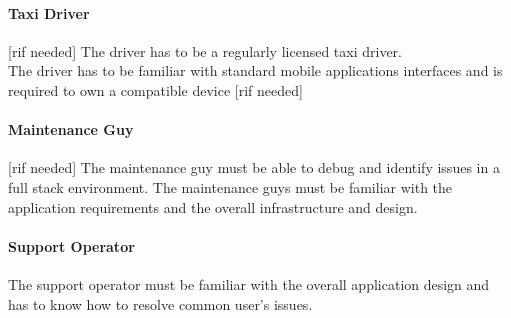 \documentclass[12pt, a4paper]{article}
\begin{document}
\paragraph{Taxi Driver}\label{par:taxy_driver} [rif needed] The driver has to be a regularly licensed taxi driver.\\ The driver has to be familiar with standard mobile applications interfaces and is required to own a compatible device [rif needed]
\paragraph{Maintenance Guy} \label{par:maintenance_guy}
[rif needed] The maintenance guy must be able to debug and identify issues in a full stack environment. The maintenance guys must be familiar with the application requirements and the overall infrastructure and design.
\paragraph{Support Operator} \label{par:support_operator} The support operator must be familiar with the overall application design and has to know how to resolve common user's issues.
\end{document}
